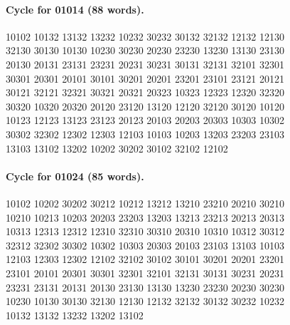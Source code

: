 \documentclass[11pt]{article}
\theoremstyle{remark}
\numberwithin{equation}{section}
\begin{document}
\paragraph{Cycle for 01014 (88 words).}
\begingroup\footnotesize\ttfamily\begin{flushleft}
10102 10132 13132 13232 10232 30232 30132 32132 12132 12130\\
32130 30130 10130 10230 30230 20230 23230 13230 13130 23130\\
20130 20131 23131 23231 20231 30231 30131 32131 32101 32301\\
30301 20301 20101 30101 30201 20201 23201 23101 23121 20121\\
30121 32121 32321 30321 20321 20323 10323 12323 12320 32320\\
30320 10320 20320 20120 23120 13120 12120 32120 30120 10120\\
10123 12123 13123 23123 20123 20103 20203 20303 10303 10302\\
30302 32302 12302 12303 12103 10103 10203 13203 23203 23103\\
13103 13102 13202 10202 30202 30102 32102 12102\\
\end{flushleft}\endgroup
\paragraph{Cycle for 01024 (85 words).}
\begingroup\footnotesize\ttfamily\begin{flushleft}
10102 10202 30202 30212 10212 13212 13210 23210 20210 30210\\
10210 10213 10203 20203 23203 13203 13213 23213 20213 20313\\
10313 12313 12312 12310 32310 30310 20310 10310 10312 30312\\
32312 32302 30302 10302 10303 20303 20103 23103 13103 10103\\
12103 12303 12302 12102 32102 30102 30101 30201 20201 23201\\
23101 20101 20301 30301 32301 32101 32131 30131 30231 20231\\
23231 23131 20131 20130 23130 13130 13230 23230 20230 30230\\
10230 10130 30130 32130 12130 12132 32132 30132 30232 10232\\
10132 13132 13232 13202 13102\\
\end{flushleft}\endgroup
\end{document}
